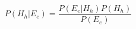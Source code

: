 \documentclass{article}
\begin{document}
\nopagecolor

\color{white}
$$    P\left(H_h|E_e\right)=\frac{P\left(E_e|H_h\right)P\left(H_h\right)}{P\left(E_e\right)}$$
\end{document}
